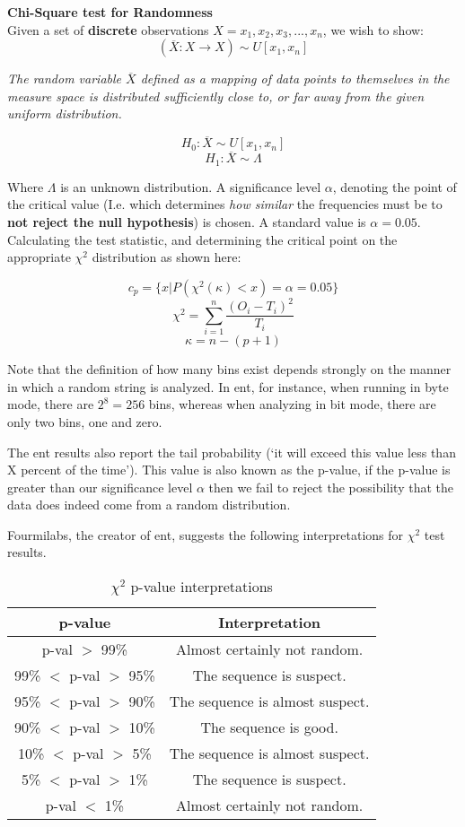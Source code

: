 \documentclass{IEEEtran}
\newenvironment{definition}[1][Definition]{\begin{trivlist}
\item[\hskip \labelsep {\bfseries #1}]}{\end{trivlist}}
\newenvironment{remark}[1][Remark]{\begin{trivlist}
\item[\hskip \labelsep {\bfseries #1}]}{\end{trivlist}}
\begin{document}
\begin{definition}
\textbf{Chi-Square test for Randomness} \\
Given a set of \textbf{discrete} observations $X = {x_1,x_2,x_3,...,x_n}$, we wish to show: 
$$(\overline{X}:X \to X)\sim U[x_1,x_n]$$ 

\textit{The random variable $\overline{X}$ defined as a mapping of data points to themselves in the measure space is distributed sufficiently close to, or far away from the given uniform distribution. }

$$H_0: \overline{X} \sim U[x_1,x_n]$$
$$H_1: \overline{X} \sim \Lambda$$ 

Where $\Lambda$ is an unknown distribution. A significance level $\alpha$, denoting the point of the critical value (I.e. which determines \textit{how similar} the frequencies must be to \textbf{not reject the null hypothesis}) is chosen. A standard value is $\alpha = 0.05$. Calculating the test statistic, and determining the critical point on the appropriate $\chi^2$ distribution as shown here: 

$$c_p = \{x \vert P(\chi^2(\kappa) < x) = \alpha = 0.05\}$$
$$\chi^2 = \sum_{i=1}^n{\frac{(O_i - T_i)^2}{T_i}}$$
$$\kappa = n - (p+1)$$ 

Note that the definition of how many bins exist depends strongly on the manner in which a random string is analyzed. In ent, for instance, when running in byte mode, there are $2^8 = 256$ bins, whereas when analyzing in bit mode, there are only two bins, one and zero. 
\end{definition}

\begin{remark}
The ent results also report the tail probability (`it will exceed this value less than X percent of the time'). This value is also known as the p-value, if the p-value is greater than our significance level $\alpha$ then we fail to reject the possibility that the data does indeed come from a random distribution.
\end{remark}

Fourmilabs, the creator of ent, suggests the following interpretations for $\chi^2$ test results. 


\begin{table}[h!]
\centering
\caption{$\chi^2$ p-value interpretations}
\begin{tabular}{|c|c|}
\hline
\textbf{p-value} & \textbf{Interpretation}\\
\hline
p-val $>$ 99\% & Almost certainly not random.\\
\hline
99\% $<$ p-val $>$ 95\% & The sequence is suspect.\\
\hline 
95\% $<$ p-val $>$ 90\% & The sequence is almost suspect.\\
\hline
90\% $<$ p-val $>$ 10\% & The sequence is good.\\
\hline
10\% $<$ p-val $>$ 5\% & The sequence is almost suspect.\\
\hline
5\% $<$ p-val $>$ 1\% & The sequence is suspect.\\ 
\hline 
p-val $<$ 1\% & Almost certainly not random.\\
\hline
\end{tabular}
\end{table}
\end{document}
